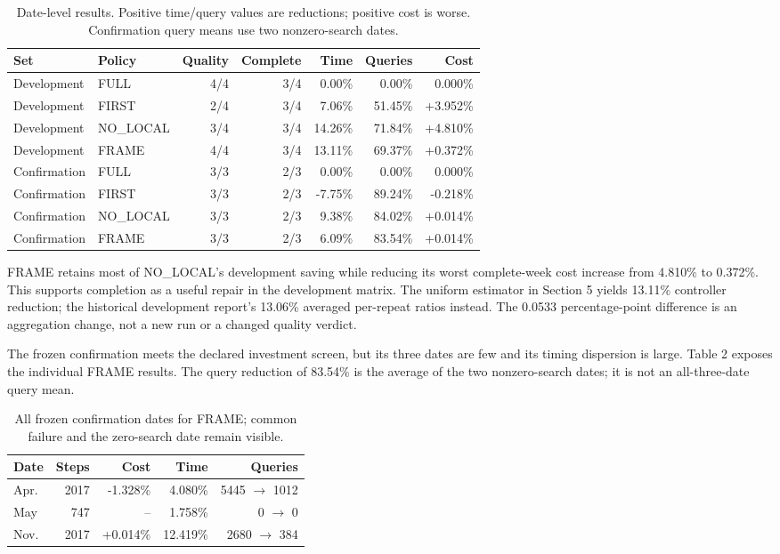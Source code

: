 \documentclass[letterpaper]{article}
\begin{document}
\begin{table}[t]
\centering
\begin{tabular}{@{}llrrrrr@{}}
\toprule
Set & Policy & Quality & Complete & Time & Queries & Cost \\
\midrule
Development & FULL & 4/4 & 3/4 & 0.00\% & 0.00\% & 0.000\% \\
Development & FIRST & 2/4 & 3/4 & 7.06\% & 51.45\% & +3.952\% \\
Development & NO\_LOCAL & 3/4 & 3/4 & 14.26\% & 71.84\% & +4.810\% \\
Development & FRAME & 4/4 & 3/4 & 13.11\% & 69.37\% & +0.372\% \\
Confirmation & FULL & 3/3 & 2/3 & 0.00\% & 0.00\% & 0.000\% \\
Confirmation & FIRST & 3/3 & 2/3 & -7.75\% & 89.24\% & -0.218\% \\
Confirmation & NO\_LOCAL & 3/3 & 2/3 & 9.38\% & 84.02\% & +0.014\% \\
Confirmation & FRAME & 3/3 & 2/3 & 6.09\% & 83.54\% & +0.014\% \\
\bottomrule
\end{tabular}
\caption{Date-level results. Positive time/query values are reductions; positive cost is worse. Confirmation query means use two nonzero-search dates.}
\end{table}

FRAME retains most of NO\_LOCAL's development saving while reducing its worst complete-week cost increase from 4.810\% to 0.372\%. This supports completion as a useful repair in the development matrix. The uniform estimator in Section 5 yields 13.11\% controller reduction; the historical development report's 13.06\% averaged per-repeat ratios instead. The 0.0533 percentage-point difference is an aggregation change, not a new run or a changed quality verdict.


The frozen confirmation meets the declared investment screen, but its three dates are few and its timing dispersion is large. Table 2 exposes the individual FRAME results. The query reduction of 83.54\% is the average of the two nonzero-search dates; it is not an all-three-date query mean.


\begin{table}[t]
\centering
\begin{tabular}{@{}lrrrr@{}}
\toprule
Date & Steps & Cost & Time & Queries \\
\midrule
Apr. & 2017 & -1.328\% & 4.080\% & 5445 $\rightarrow$ 1012 \\
May & 747 & -- & 1.758\% & 0 $\rightarrow$ 0 \\
Nov. & 2017 & +0.014\% & 12.419\% & 2680 $\rightarrow$ 384 \\
\bottomrule
\end{tabular}
\caption{All frozen confirmation dates for FRAME; common failure and the zero-search date remain visible.}
\end{table}
\end{document}
